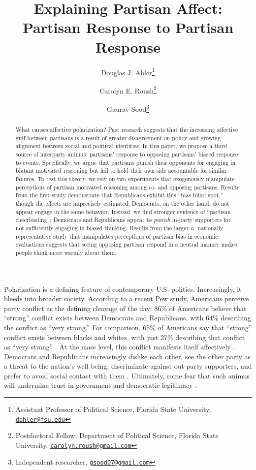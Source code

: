 \documentclass[12pt, letterpaper]{article}
\title{Explaining Partisan Affect: Partisan Response to Partisan Response}
\author{Douglas J. Ahler\thanks{Assistant Professor of Political Science, Florida State University, \href{mailto:dahler@fsu.edu}{\texttt{dahler@fsu.edu}}} \and Carolyn E. Roush\thanks{Postdoctoral Fellow, Department of Political Science, Florida State University, \href{mailto:carolyn.roush@gmail.com}{\texttt{carolyn.roush@gmail.com}}} \and Gaurav Sood\thanks{Independent researcher, \href{gsood07@gmail.com}{\texttt{gsood07@gmail.com}}}}
\begin{document}
\maketitle
\thispagestyle{empty}

\begin{abstract}

\noindent What causes affective polarization? Past research suggests that the increasing affective gulf between partisans is a result of greater disagreement on policy and growing alignment between social and political identities. In this paper, we propose a third source of interparty animus: partisans' response to opposing partisans' biased response to events. Specifically, we argue that partisans punish their opponents for engaging in blatant motivated reasoning but fail to hold their own side accountable for similar failures. To test this theory, we rely on two experiments that exogenously manipulate perceptions of partisan motivated reasoning among co- and opposing partisans. Results from the first study demonstrate that Republicans exhibit this ``bias blind spot,'' though the effects are imprecisely estimated; Democrats, on the other hand, do not appear engage in the same behavior. Instead, we find stronger evidence of ``partisan cheerleading'': Democrats and Republicans appear to \textit{punish} in-party supporters for not sufficiently engaging in biased thinking.  Results from the larger-$n$, nationally representative study that manipulates perceptions of partisan bias in economic evaluations suggests that seeing opposing partisan respond in a neutral manner makes people think more warmly about them.

\end{abstract}

\newpage

\doublespacing
Polarization is a defining feature of contemporary U.S. politics. Increasingly, it bleeds into broader society. According to a recent Pew study, Americans perceive party conflict as the defining cleavage of the day: 86\% of Americans believe that ``strong'' conflict exists between Democrats and Republicans, with 64\% describing the conflict as ``very strong.'' For comparison, 65\% of Americans say that ``strong'' conflict exists between blacks and whites, with just 27\% describing that conflict as ``very strong'' \citep{pew2018far}. At the mass level, this conflict manifests itself affectively \citep{IyengarSoodLelkes2012}. Democrats and Republicans increasingly dislike each other, see the other party as a threat to the nation's well being, discriminate against out-party supporters, and prefer to avoid social contact with them \citep{pew_polarization}. Ultimately, some fear that such animus will undermine trust in government and democratic legitimacy \citep{hetheringtonrudolph_2015}.
\end{document}
